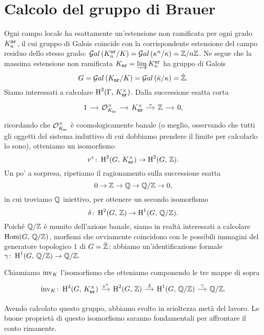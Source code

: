 \section{Calcolo del gruppo di Brauer}
Ogni campo locale ha esattamente un'estensione non ramificata per ogni grado $ {K^\mathtt{nr}_n} $, il cui gruppo di Galois coincide con la corrispondente estensione del campo residuo dello stesso grado: $ \mathcal{G}al\left( {K^\mathtt{nr}_n} / K \right) = \mathcal{G}al\left( \kappa^n / \kappa \right) = \mathbb{Z} / n\mathbb{Z} $. Ne segue che la massima estensione non ramificata $ K_\mathtt{nr} = \varinjlim {K^\mathtt{nr}_n} $ ha gruppo di Galois
\[ G = \mathcal{G}al\left( K_\mathtt{nr} / K \right) = \mathcal{G}al\left( \bar{\kappa} / \kappa \right) = \hat{\mathbb{Z}}. \]
Siamo interessati a calcolare $ \operatorname{H}^2(\Gamma, \, K_\mathtt{nr}^\times) $. Dalla successione esatta corta
\[ \begin{tikzcd}[column sep = small]
1 \rar
& \mathcal{O}_{\knr}^\times \rar
& \knr^\times \rar["v"]
& \Z \rar
& 0,
\end{tikzcd} \]
ricordando che $ \mathcal{O}_{K_\mathtt{nr}}^\times $ è coomologicamente banale (o meglio, osservando che tutti gli oggetti del sistema induttivo di cui dobbiamo prendere il limite per calcolarlo lo sono), otteniamo un isomorfismo
\[ v^* \colon \operatorname{H}^2(G, \, K_\mathtt{nr}^\times) \to \operatorname{H}^2(G, \, \mathbb{Z}). \]
Un po' a sorpresa, ripetiamo il ragionamento sulla successione esatta
\[ 0 \to \mathbb{Z} \to \mathbb{Q} \to \mathbb{Q}/\mathbb{Z} \to 0, \]
in cui troviamo $ \mathbb{Q} $ iniettivo, per ottenere un secondo isomorfismo
\[ \delta \colon \operatorname{H}^2(G, \, \mathbb{Z}) \to \operatorname{H}^1(G, \, \mathbb{Q}/\mathbb{Z}). \]
Poiché $ \mathbb{Q}/\mathbb{Z} $ è munito dell'azione banale, siamo in realtà interessati a calcolare $ \operatorname{Hom}(G, \, \mathbb{Q}/\mathbb{Z}) $, morfismi che ovviamente coincidono con le possibili immagini del generatore topologico $ 1 $ di $ G = \hat{\mathbb{Z}} $: abbiamo un'identificazione formale $ \gamma \colon \operatorname{H}^1(G, \, \mathbb{Q}/\mathbb{Z}) \to \mathbb{Q}/\mathbb{Z}.  $

\begin{definition}
	Chiamiamo $ \operatorname{inv}_K $ l'isomorfismo che otteniamo componendo le tre mappe di sopra
	\[ \begin{tikzcd}[column sep = small]
	\inv_\K \colon \HH^2(G, \, \knr^\times)  \rar["v^*"]
	& \HH^2(G, \, \Z) \rar["\delta"]
	& \HH^1(G, \, \Q/\Z) \rar["\gamma"]
	& \Q/\Z.
	\end{tikzcd} \]
\end{definition}

Avendo calcolato questo gruppo, abbiamo svolto in scioltezza metà del lavoro. Le buone proprietà di questo isomorfismo saranno fondamentali per affrontare il conto rimanente.

